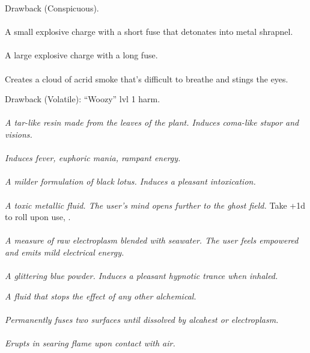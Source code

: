 \documentclass{article}
\begin{document}
\begin{multicols*}{3}
Drawback (Conspicuous).
\\\\
A small explosive charge with a short fuse that detonates into metal shrapnel.
\\\\
A large explosive charge with a long fuse.
\HasAmount
\\\\
Creates a cloud of acrid smoke that's difficult to breathe and stings the eyes.


Drawback (Volatile): ``Woozy'' lvl 1 harm.
\\\\
\textit{A tar-like resin made from the leaves of the plant.
Induces coma-like stupor and visions.}
\HasAmount
\\\\
\textit{Induces fever, euphoric mania, rampant energy.}
\HasAmount
\\\\
\textit{A milder formulation of black lotus.
Induces a pleasant intoxication.}
\HasAmount
\\\\
\textit{A toxic metallic fluid.
The user's mind opens further to the ghost field.}
Take +1d to  roll upon use, .
\\\\
\textit{A measure of raw electroplasm blended with seawater.
The user feels empowered and emits mild electrical energy.}
\\\\
\textit{A glittering blue powder.
Induces a pleasant hypnotic trance when inhaled.}


\textit{A fluid that stops the effect of any other alchemical.}
\\\\
\textit{Permanently fuses two surfaces until dissolved by alcahest or electroplasm.}
\\\\
\textit{Erupts in searing flame upon contact with air.}



\end{multicols*}
\end{document}
